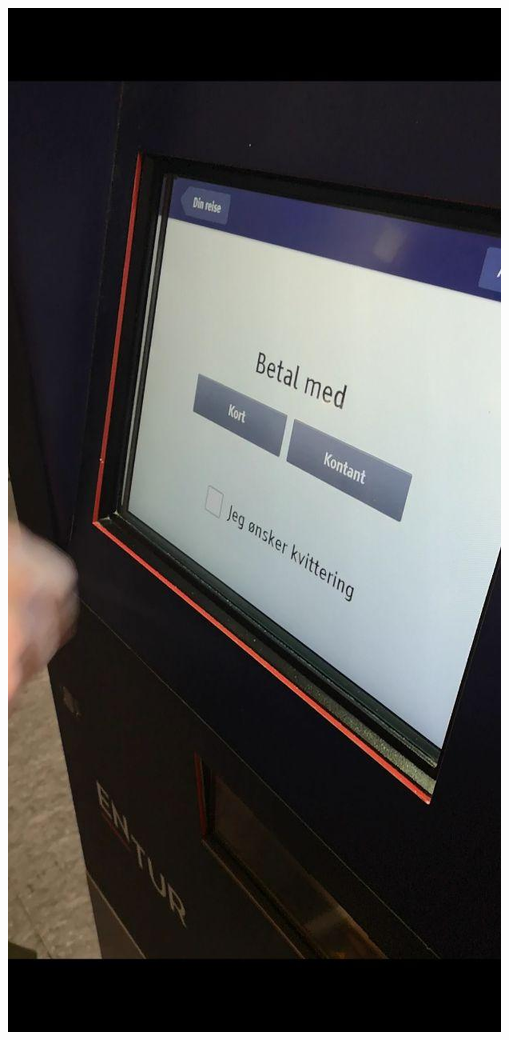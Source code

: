\documentclass{../../myassignment}
\begin{document}
	\includegraphics[scale=0.25]{pictures2/paywith.jpg}
\end{document}

